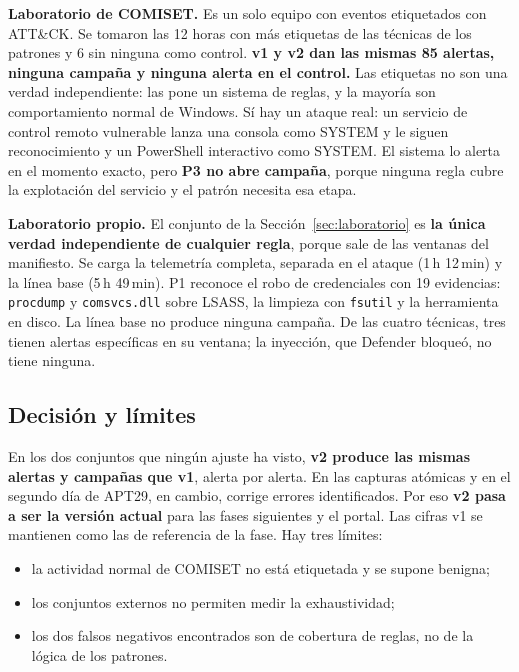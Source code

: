 \medskip\noindent\textbf{Laboratorio de COMISET.} Es un solo equipo con eventos etiquetados con ATT\&CK. Se
tomaron las 12 horas con más etiquetas de las técnicas de los patrones y 6 sin ninguna como
control. \textbf{v1 y v2 dan las mismas 85 alertas, ninguna campaña y ninguna alerta en el control.}
Las etiquetas no son una verdad independiente: las pone un sistema de reglas, y la mayoría son
comportamiento normal de Windows. Sí hay un ataque real: un servicio de control remoto vulnerable
lanza una consola como SYSTEM y le siguen reconocimiento y un PowerShell interactivo como SYSTEM.
El sistema lo alerta en el momento exacto, pero \textbf{P3 no abre campaña}, porque ninguna regla
cubre la explotación del servicio y el patrón necesita esa etapa.

\medskip\noindent\textbf{Laboratorio propio.} El conjunto de la Sección~\ref{sec:laboratorio} es \textbf{la
única verdad independiente de cualquier regla}, porque sale de las ventanas del manifiesto. Se carga
la telemetría completa, separada en el ataque (1\,h 12\,min) y la línea base (5\,h 49\,min). P1
reconoce el robo de credenciales con 19 evidencias: \texttt{procdump} y \texttt{comsvcs.dll} sobre
LSASS, la limpieza con \texttt{fsutil} y la herramienta en disco. La línea base no produce ninguna
campaña. De las cuatro técnicas, tres tienen alertas específicas en su ventana; la inyección, que
Defender bloqueó, no tiene ninguna.

\subsection{Decisión y límites}

En los dos conjuntos que ningún ajuste ha visto, \textbf{v2 produce las mismas alertas y campañas que
v1}, alerta por alerta. En las capturas atómicas y en el segundo día de APT29, en cambio, corrige
errores identificados. Por eso \textbf{v2 pasa a ser la versión actual} para las fases siguientes y
el portal. Las cifras v1 se mantienen como las de referencia de la fase. Hay tres límites:
\begin{itemize}
    \item la actividad normal de COMISET no está etiquetada y se supone benigna;
    \item los conjuntos externos no permiten medir la exhaustividad;
    \item los dos falsos negativos encontrados son de cobertura de reglas, no de la lógica de los
    patrones.
\end{itemize}
